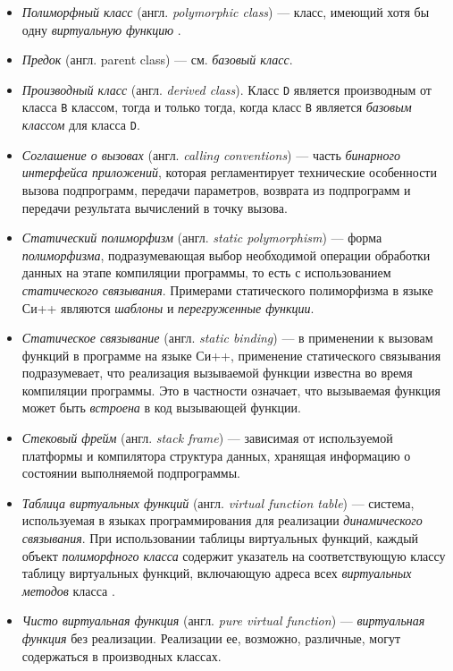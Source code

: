 \begin{itemize}
\item {\it Полиморфный класс} (англ. {\it polymorphic class}) --- класс, имеющий хотя бы одну {\it виртуальную функцию} \cite{stroustrup97ru}.
\item {\it Предок} (англ. parent class) --- см. {\it базовый класс}.
\item {\it Производный класс} (англ. {\it derived class}). Класс \lstinline{D} является производным от класса \lstinline{B} классом, тогда и только тогда, когда класс \lstinline{B} является {\it базовым классом} для класса \lstinline{D}.
\item {\it Соглашение о вызовах} (англ. {\it calling conventions}) --- часть {\it бинарного интерфейса приложений}, которая регламентирует технические особенности вызова подпрограмм, передачи параметров, возврата из подпрограмм и передачи результата вычислений в точку вызова.
\item {\it Статический полиморфизм} (англ. {\it static polymorphism}) --- форма {\it полиморфизма}, подразумевающая выбор необходимой операции обработки данных на этапе компиляции программы, то есть с использованием {\it статического связывания}. Примерами статического полиморфизма в языке Си++ являются {\it шаблоны} и {\it перегруженные функции}.
\item {\it Статическое связывание} (англ. {\it static binding}) --- в применении к вызовам функций в программе на языке Си++, применение статического связывания подразумевает, что реализация вызываемой функции известна во время компиляции программы. Это в частности означает, что вызываемая функция может быть {\it встроена} в код вызывающей функции.
\item {\it Стековый фрейм} (англ. {\it stack frame}) --- зависимая от используемой платформы и компилятора структура данных, хранящая информацию о состоянии выполняемой подпрограммы.
\item {\it Таблица виртуальных функций} (англ. {\it virtual function table}) --- система, используемая в языках программирования для реализации {\it динамического связывания}. При использовании таблицы виртуальных функций, каждый объект {\it полиморфного класса} содержит указатель на соответствующую классу таблицу виртуальных функций, включающую адреса всех {\it виртуальных методов} класса \cite{stroustrup90ru}.
\item {\it Чисто виртуальная функция} (англ. {\it pure virtual function}) --- {\it виртуальная функция} без реализации. Реализации ее, возможно, различные, могут содержаться в производных классах.

\end{itemize}

